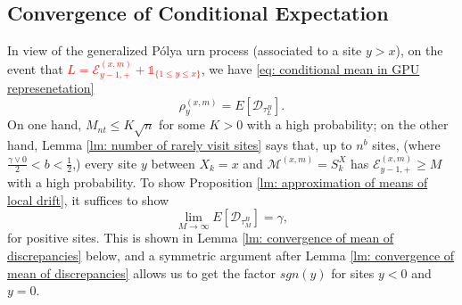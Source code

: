 \documentclass[twoside,12pt,a4paper]{article}
\numberwithin{equation}{section}
\newcommand{\edt}[1]{\textcolor{red}{#1}} %
\newcommand{\comment}[1]{\textcolor{blue}{#1}}
\begin{document}
		\subsection{Convergence of Conditional Expectation}
		In view of the generalized P\'{o}lya urn process (associated to a site $y> x$), 
		on the event that \edt{$ L = \mathcal{E}^{(x,m)}_{y-1,+} +\mathbb{1}_{\{1\leq y\leq x\}}$}, we have \eqref{eq: conditional mean in GPU represenetation} 
		$$\rho^{(x,m)}_y = E[\mathcal{D}_{\tau_L^B}].$$ 
		On one hand, $M_{nt} \leq K\sqrt{n} $ for some $K>0$ with a high probability; on the other hand, Lemma \ref{lm: number of rarely visit sites} says that, up to $n^b$ sites, (where $\frac{\gamma \vee 0}{2}<b<\frac{1}{2}$,) every site $y$ between $X_k=x$ and $\mathcal{M}^{(x,m)} =S_{k}^X$ has $ \mathcal{E}^{(x,m)}_{y-1,+} \geq M  $ with a high probability. To show Proposition \ref{lm: approximation of means of local drift}, it suffices to show 
		\begin{equation}\label{eq: convergence of conditional expectation}
			\lim_{M\to\infty} E[\mathcal{D}_{\tau_M^B}] = \gamma , 
		\end{equation} for positive sites. This is shown in Lemma \ref{lm: convergence of mean of discrepancies} below, and a symmetric argument after Lemma \ref{lm: convergence of mean of discrepancies} allows us to get the factor $sgn(y)$ for sites $y<0$ and $y=0$.
		
\end{document}
